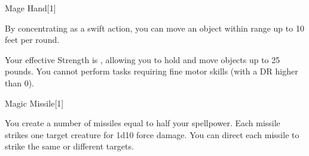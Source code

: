 \begin{spellsection}{Mage Hand}[1]
    \begin{spellheader}
    \end{spellheader}
    \begin{spellcontent}
        \begin{spelltargetinginfo}
            \spellrng{\rngclose}
        \end{spelltargetinginfo}
        \begin{spelleffects}
            \spelleffect By concentrating as a swift action, you can move an object within range up to 10 feet per round.

            Your effective Strength is , allowing you to hold and move objects up to 25 pounds. You cannot perform tasks requiring fine motor skills (with a DR higher than 0).
            \spelldur \durshort
        \end{spelleffects}
    \end{spellcontent}
    \begin{spellfooter}
        \miscastexplode
    \end{spellfooter}
\end{spellsection}

\begin{spellsection}{Magic Missile}[1]
    \begin{spellheader}
    \end{spellheader}
    \begin{spellcontent}
        \begin{spelltargetinginfo}
        \end{spelltargetinginfo}
        \begin{spelleffects}
            \spelleffect You create a number of missiles equal to half your spellpower. Each missile strikes one target creature for 1d10 force damage. You can direct each missile to strike the same or different targets.
        \end{spelleffects}
    \end{spellcontent}
    \begin{spellfooter}
        \spellnotes \forcespellnotes
        \miscastrandom
    \end{spellfooter}
    \begin{spellaugments}
    \end{spellaugments}
\end{spellsection}

